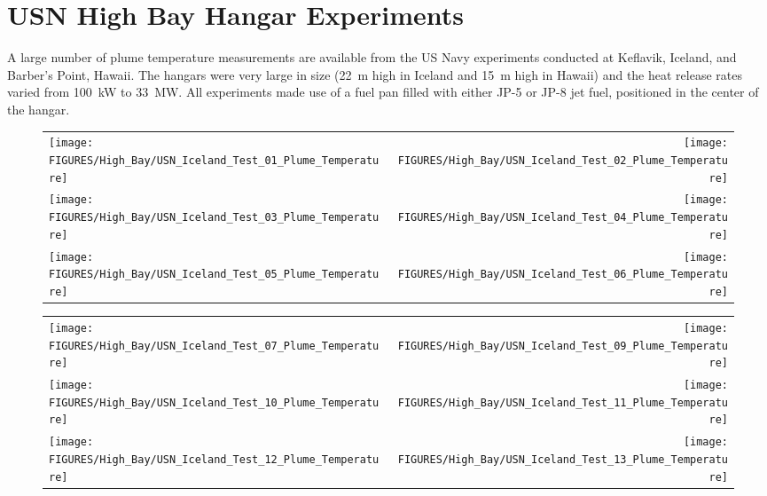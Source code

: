 \clearpage

\section{USN High Bay Hangar Experiments}

\label{USN_Plume}

A large number of plume temperature measurements are available from the US Navy experiments conducted at Keflavik, Iceland, and Barber's Point, Hawaii. The hangars were very large in size (22~m high in Iceland and 15~m high in Hawaii) and the heat release rates varied from 100~kW to 33~MW. All experiments made use of a fuel pan filled with either JP-5 or JP-8 jet fuel, positioned in the center of the hangar.


\begin{figure}[h!]
\begin{tabular*}{\textwidth}{l@{\extracolsep{\fill}}r}
\texttt{[image: FIGURES/High\_Bay/USN\_Iceland\_Test\_01\_Plume\_Temperature]} &
\texttt{[image: FIGURES/High\_Bay/USN\_Iceland\_Test\_02\_Plume\_Temperature]} \\
\texttt{[image: FIGURES/High\_Bay/USN\_Iceland\_Test\_03\_Plume\_Temperature]} &
\texttt{[image: FIGURES/High\_Bay/USN\_Iceland\_Test\_04\_Plume\_Temperature]} \\
\texttt{[image: FIGURES/High\_Bay/USN\_Iceland\_Test\_05\_Plume\_Temperature]} &
\texttt{[image: FIGURES/High\_Bay/USN\_Iceland\_Test\_06\_Plume\_Temperature]} \\
\end{tabular*}
\label{USN_Plume_Iceland_Plume_Temperature}
\end{figure}

\begin{figure}[p]
\begin{tabular*}{\textwidth}{l@{\extracolsep{\fill}}r}
\texttt{[image: FIGURES/High\_Bay/USN\_Iceland\_Test\_07\_Plume\_Temperature]} &
\texttt{[image: FIGURES/High\_Bay/USN\_Iceland\_Test\_09\_Plume\_Temperature]} \\
\texttt{[image: FIGURES/High\_Bay/USN\_Iceland\_Test\_10\_Plume\_Temperature]} &
\texttt{[image: FIGURES/High\_Bay/USN\_Iceland\_Test\_11\_Plume\_Temperature]} \\
\texttt{[image: FIGURES/High\_Bay/USN\_Iceland\_Test\_12\_Plume\_Temperature]} &
\texttt{[image: FIGURES/High\_Bay/USN\_Iceland\_Test\_13\_Plume\_Temperature]} \\
\end{tabular*}
\label{USN_Plume_Iceland_2}
\end{figure}

